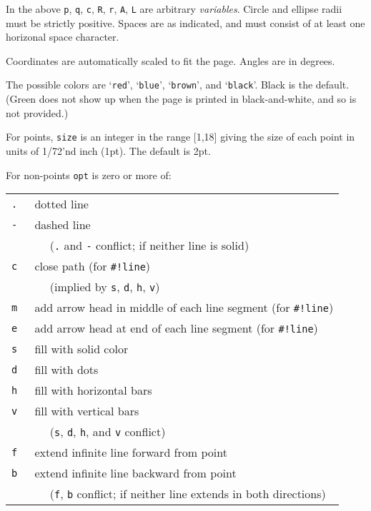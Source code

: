 \documentclass[12pt]{article}
\begin{document}
In the above {\tt p}, {\tt q}, {\tt c}, {\tt R}, {\tt r}, {\tt A}, {\tt L}
are arbitrary {\em variables}.
Circle and ellipse radii must be strictly positive.
Spaces are as indicated, and must consist
of at least one horizonal space character.

Coordinates are automatically scaled to fit the page.  Angles are
in degrees.

The possible colors
are `{\tt red}', `{\tt blue}', `{\tt brown}', and `{\tt black}'.  Black is
the default.
(Green does not show up when the page is printed in black-and-white, and
so is not provided.)

For points, {\tt size} is an integer in the range [1,18] giving the size
of each point in units of 1/72'nd inch (1pt).  The default is 2pt.

\begin{minipage}{\textwidth}
For non-points {\tt opt} is zero or more of:
\\[1ex]
\hspace*{0.5in}\begin{tabular}{rl}
    \tt . & dotted line \\
    \tt - & dashed line \\
          & ~~ ({\tt .} and {\tt -} conflict; if neither line is solid) \\
    \tt c & close path (for {\tt \#!line}) \\
          & ~~ (implied by {\tt s}, {\tt d}, {\tt h}, {\tt v}) \\
    \tt m & add arrow head in middle of each line segment (for {\tt \#!line}) \\
    \tt e & add arrow head at end of each line segment (for {\tt \#!line}) \\
    \tt s & fill with solid color \\
    \tt d & fill with dots \\
    \tt h & fill with horizontal bars \\
    \tt v & fill with vertical bars \\
          & ~~ ({\tt s}, {\tt d}, {\tt h}, and {\tt v} conflict) \\
    \tt f & extend infinite line forward from point \\
    \tt b & extend infinite line backward from point \\
          & ~~ ({\tt f}, {\tt b} conflict; if neither
	        line extends in both directions) \\
    \end{tabular}
\end{minipage}
\end{document}
